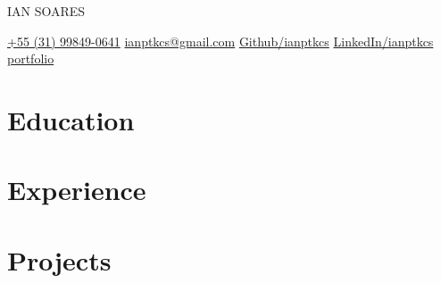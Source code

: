 \documentclass[11pt]{article}
\begin{document}
\begin{center}
  {
    \fontsize{36}{12}\selectfont\color{accent}
    IAN SOARES
  } \\ \medskip

  \href{tel:+5531998490641}{{\color{gray}{\faPhone}} +55 (31) 99849-0641} \quad
  \href{mailto:ianptkcs@gmail.com}{{\color{gray}{\faEnvelope}} ianptkcs@gmail.com} \quad
  \href{https://github.com/ianptkcs}{{\color{gray}{\faGithub}} Github/ianptkcs} \quad
  \href{https://linkedin.com/in/ianptkcs}{{\color{gray}{\faLinkedin}} LinkedIn/ianptkcs}
  \href{https://portfolio-red-bice-eight.vercel.app/}{{\color{gray}{\faBriefcase}} portfolio}
\end{center}

\section{Education}

\section{Experience}

\section{Projects}
\end{document}
